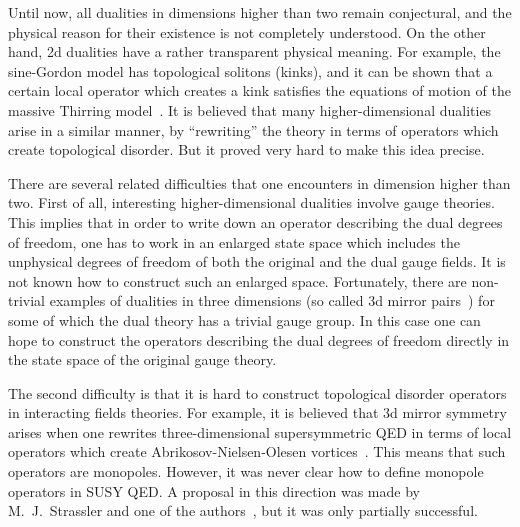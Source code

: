 \documentclass[a4paper,12pt, amsfonts, amssymb]{article}
\begin{document}
Until now, all dualities in dimensions
higher than two remain conjectural, and the physical reason for their existence is not completely understood. On the other hand, 2d dualities have a rather
transparent physical meaning. For example, the sine-Gordon model has
topological solitons (kinks), and it can be shown that a certain local
operator which creates a kink satisfies the equations of motion of the
massive Thirring model~\cite{Mandelstam}. 
It is believed that many higher-dimensional
dualities arise in a similar manner, by ``rewriting'' the theory in terms
of operators which create topological disorder. But it proved very hard
to make this idea precise. 

There are several related difficulties that one encounters in dimension
higher than two. First of all, interesting higher-dimensional
dualities involve gauge theories. This implies that in order to write
down an operator describing the dual degrees of freedom,
one has to work in an enlarged state space which includes the
unphysical degrees of freedom of both the original and the dual gauge fields. It is not known how to construct such an enlarged space.
Fortunately,
there are non-trivial examples of dualities in three dimensions 
(so called 3d mirror pairs~\cite{IS}) for some of which the dual theory has a 
trivial gauge group. In this case one can hope to construct the
operators describing the dual degrees of freedom directly in the 
state space of the original gauge theory. 

The second difficulty is that it is hard to construct
topological disorder operators in interacting fields theories. For
example, it is believed that 3d mirror symmetry arises when one
rewrites three-dimensional supersymmetric QED in terms of local operators 
which create Abrikosov-Nielsen-Olesen vortices~\cite{five}. 
This means that such operators are monopoles.
However, it was never clear how to define monopole operators in
SUSY QED. A proposal in this direction was made by M.~J.~Strassler and 
one of the authors~\cite{KS}, but it was only partially
successful.
\end{document}

